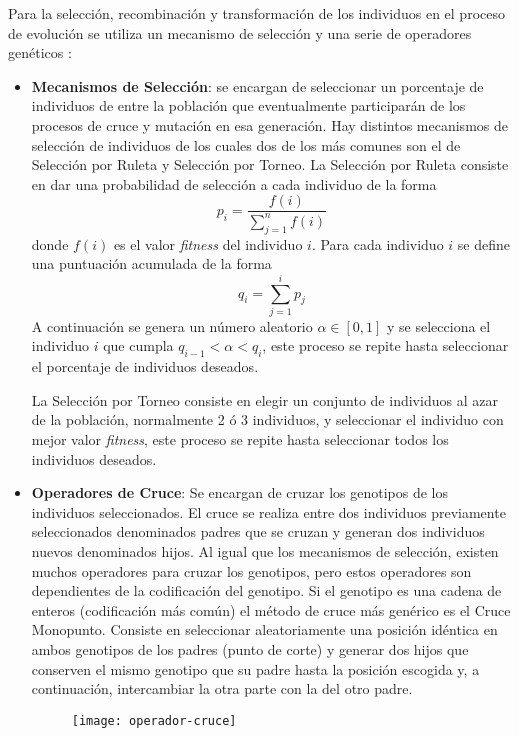 Para la selección, recombinación y transformación de los individuos en el proceso de evolución se utiliza un mecanismo de selección y una serie de operadores genéticos \cite{cervigon09}:

\begin{itemize}
\item \textbf{Mecanismos de Selección}: se encargan  de seleccionar un porcentaje de individuos de entre la población que eventualmente participarán de los procesos de cruce y mutación en esa generación. Hay distintos mecanismos de selección de individuos de los cuales dos de los más comunes son el de Selección por Ruleta y Selección por Torneo. La Selección por Ruleta consiste en dar una probabilidad de selección a cada individuo de la forma
\begin{equation}
p_i = \frac{f(i)}{\sum\limits_{j=1}^n f(i)}
\end{equation}
donde $f(i)$ es el valor \textit{fitness} del individuo $i$. Para cada individuo $i$ se define una puntuación acumulada de la forma
\begin{equation}
q_i = \sum\limits_{j=1}^i p_j
\end{equation}
A continuación se genera un número aleatorio $\alpha \in [0,1]$ y se selecciona el individuo $i$ que cumpla $q_{i-1} < \alpha < q_i$, este proceso se repite hasta seleccionar el porcentaje de individuos deseados. 

La Selección por Torneo consiste en elegir un conjunto de individuos al azar de la población, normalmente 2 ó 3 individuos, y seleccionar el individuo con mejor valor \textit{fitness}, este proceso se repite hasta seleccionar todos los individuos deseados.

\item \textbf{Operadores de Cruce}: Se encargan de cruzar los genotipos de los individuos seleccionados. El cruce se realiza entre dos individuos previamente seleccionados denominados padres que se cruzan y generan dos individuos nuevos denominados hijos. Al igual que los mecanismos de selección, existen muchos operadores  para cruzar los genotipos, pero estos operadores son dependientes de la codificación del genotipo. Si el genotipo es una cadena de enteros (codificación más común) el método de cruce más genérico es el Cruce Monopunto. Consiste en seleccionar aleatoriamente una posición idéntica en ambos genotipos de los padres (punto de corte) y generar dos hijos que conserven el mismo genotipo que su padre hasta la posición escogida y, a continuación, intercambiar la otra parte con la del otro padre.
\begin{figure}[H]
\centering
\texttt{[image: operador-cruce]}
\end{figure}


\end{itemize}
